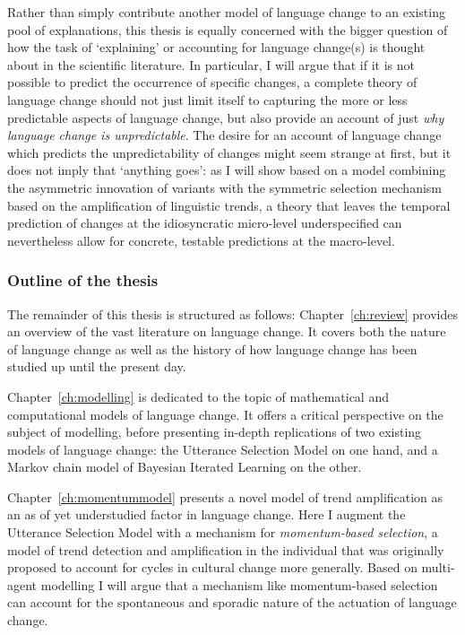 Rather than simply contribute another model of language change to an existing pool of explanations, this thesis is equally concerned with the bigger question of how the task of `explaining' or accounting for language change(s) is thought about in the scientific literature.
In particular, I will argue that if it is not possible to predict the occurrence of specific changes, a complete theory of language change should not just limit itself to capturing the more or less predictable aspects of language change, but also provide an account of just \emph{why language change is unpredictable}.
The desire for an account of language change which predicts the unpredictability of changes might seem strange at first, but it does not imply that `anything goes': as I will show based on a model combining the asymmetric innovation of variants with the symmetric selection mechanism based on the amplification of linguistic trends, a theory that leaves the temporal prediction of changes at the idiosyncratic micro-level underspecified can nevertheless allow for concrete, testable predictions at the macro-level. %


\subsubsection{Outline of the thesis}

The remainder of this thesis is structured as follows: Chapter~\ref{ch:review} provides an overview of the vast literature on language change. It covers both the nature of language change as well as the history of how language change has been studied up until the present day. %

Chapter~\ref{ch:modelling} is dedicated to the topic of mathematical and computational models of language change. It offers a critical perspective on the subject of modelling, before presenting in-depth replications of two existing models of language change: the Utterance Selection Model on one hand, and a Markov chain model of Bayesian Iterated Learning on the other.

Chapter~\ref{ch:momentummodel} presents a novel model of trend amplification as an as of yet understudied factor in language change. Here I augment the Utterance Selection Model with a mechanism for \emph{momentum-based selection}, a model of trend detection and amplification in the individual that was originally proposed to account for cycles in cultural change more generally. Based on multi-agent modelling I will argue that a mechanism like momentum-based selection can account for the spontaneous and sporadic nature of the actuation of language change.

